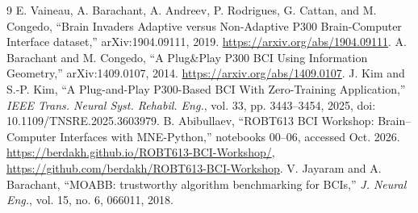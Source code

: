 \documentclass[conference]{IEEEtran}
\begin{document}
\clearpage
\begin{thebibliography}{9}
 E. Vaineau, A. Barachant, A. Andreev, P. Rodrigues, G. Cattan, and M. Congedo,
``Brain Invaders Adaptive versus Non-Adaptive P300 Brain-Computer Interface dataset,''
arXiv:1904.09111, 2019. \url{https://arxiv.org/abs/1904.09111}.
 A. Barachant and M. Congedo, ``A Plug\&Play P300 BCI Using Information Geometry,''
arXiv:1409.0107, 2014. \url{https://arxiv.org/abs/1409.0107}.
 J. Kim and S.-P. Kim, ``A Plug-and-Play P300-Based BCI With Zero-Training Application,''
\emph{IEEE Trans. Neural Syst. Rehabil. Eng.}, vol. 33, pp. 3443--3454, 2025,
doi: 10.1109/TNSRE.2025.3603979.
 B. Abibullaev, ``ROBT613 BCI Workshop: Brain--Computer Interfaces with
MNE-Python,'' notebooks 00--06, accessed Oct. 2026.
\url{https://berdakh.github.io/ROBT613-BCI-Workshop/},
\url{https://github.com/berdakh/ROBT613-BCI-Workshop}.
 V. Jayaram and A. Barachant, ``MOABB: trustworthy algorithm benchmarking for BCIs,''
\emph{J. Neural Eng.}, vol. 15, no. 6, 066011, 2018.
\end{thebibliography}
\end{document}
